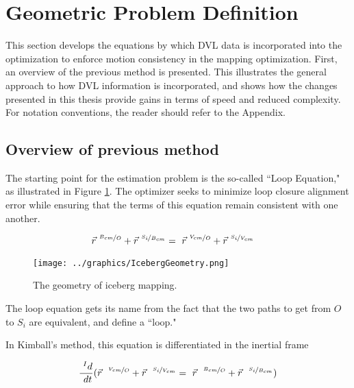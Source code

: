 
\section{Geometric Problem Definition}

This section develops the equations by which DVL data is incorporated into the optimization to enforce motion consistency in the mapping optimization. First, an overview of the previous method is presented. This illustrates the general approach to how DVL information is incorporated, and shows how the changes presented in this thesis provide gains in terms of speed and reduced complexity. For notation conventions, the reader should refer to the Appendix.

\subsection{Overview of previous method}
The starting point for the estimation problem is the so-called ``Loop Equation," as illustrated in Figure \ref{fig:LoopEquation}. The optimizer seeks to minimize loop closure alignment error while ensuring that the terms of this equation remain consistent with one another. 

\begin{align}
\vec{r}^{~\nicefrac{B_{cm}}{O}} + \vec{r}^{~\nicefrac{S_i}{B_{cm}}} &= ~\vec{r}^{~\nicefrac{V_{cm}}{O}} + \vec{r}^{~\nicefrac{S_i}{V_{cm}}}
\label{eqn:BasicLoop}
\end{align}

\begin{figure}[htbp]
   \centering
   \texttt{[image: ../graphics/IcebergGeometry.png]} %
   \caption{The geometry of iceberg mapping. }  
    \label{fig:LoopEquation}
\end{figure}

The loop equation gets its name from the fact that the two paths to get from $O$ to $S_i$ are equivalent, and define a ``loop."

In Kimball's method, this equation is differentiated in the inertial frame

\begin{equation} %
   \frac{~^Id}{~dt}(\vec{r}^{~~\nicefrac{V_{cm}}{O}} + \vec{r}^{~~\nicefrac{S_i}{V_{cm}}} = ~ \vec{r}^{~~\nicefrac{B_{cm}}{O}} + \vec{r}^{~~\nicefrac{S_i}{B_{cm}}})\\
   \end{equation}
   
